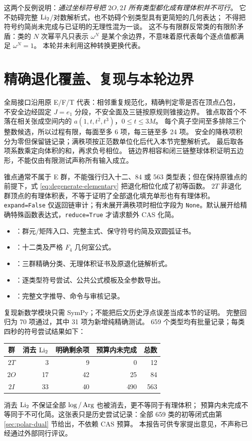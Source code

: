 这两个反例说明：\emph{通过坐标符号把 $2O,2I$ 所有类型都化成有理体积并不可行}。
它不妨碍完整 $\operatorname{Li}_2$/对数解析式，也不妨碍个别类型具有更简短的几何表达；
不得把符号约简尚未完成与已证明的无理性混为一谈。
这不与有限群反常类的有限阶矛盾：类的 $N$ 次幂平凡只表示
$\omega^N$ 是某个余边界，不意味着原代表每个逐点值都满足 $\omega^N=1$。
本轮并未利用这种转换更换代表。

\section{精确退化覆盖、复现与本轮边界}

全局接口沿用原 E/F/T 代表：相邻重复规范化，精确判定零是否在顶点凸包，
不安全边经固定 $J=e_1$ 分段，不安全面及三链按原规则锥接边界。
锥点取首个不落在相关张成空间内的 $a(1,t,t^2,t^3)$，$0\le t\le3M$。
每个真子空间至多排除三个整数候选，所以过程有限，每面至多 6 项，每三链至多 24 项。
安全的降秩项积分为零但保留链记录；满秩项按正范数单位化后代入本节完整解析式。
最后取各项系数乘定向体积的和，再求负号相位。
链边界相容和闭三链整球体积证明五边形，不能仅由有限测试声称所有输入成立。

锥点通常不属于 E 群，不能强行归入十二、84 或 563 类型表；但在保持原锥点的前提下，式 \eqref{eq:degenerate-elementary} 把退化相位化成了初等函数。
$2T$ 非退化群顶点的有理体积表，不等于证明了全部退化填充单形也有有理体积。
\texttt{expand=False} 仅返回链审计；有未展开满秩项时相位字段为
\texttt{None}。默认展开给精确特殊函数表达式，\texttt{reduce=True} 才请求额外 CAS 化简。

\begin{itemize}
\item {}：群元/矩阵入口、完整主式、保守符号约简及双圆弧证书。
\item {}：十二类及严格 $F_4$ 几何室公式。
\item {}：三群精确分类、无理体积证书及原退化链解析式。
\item {}：逐类型符号尝试、公共公式模板及全参数导出。
\item {}：完整文字推导、命令与审核记录。
\end{itemize}
复现新数学模块只需 SymPy；不能把后文历史浮点误差当成本节的证明。
完整回归为 70 项通过，其中 31 项为新增纯精确测试。
659 个类型均有批量记录；每类四秒的符号尝试结果如下：
\begin{center}
\begin{tabular}{@{}crrrr@{}}\toprule
群&消去 $\operatorname{Li}_2$&明确剩余项&预算内未完成&总数\\\midrule
$2T$&3&9&0&12\\
$2O$&17&42&25&84\\
$2I$&33&40&490&563\\\bottomrule
\end{tabular}\end{center}
消去 $\operatorname{Li}_2$ 不保证全部 $\log/\operatorname{Arg}$ 也被消去，更不等同于有理体积；
预算内未完成不等同于不可化简。这张表只是历史尝试记录：全部 659 类的初等闭式由第 \ref{sec:polar-dual} 节给出，不依赖 CAS 预算。
本报告可供专家提出意见，不声称已经通过外部同行评议。
